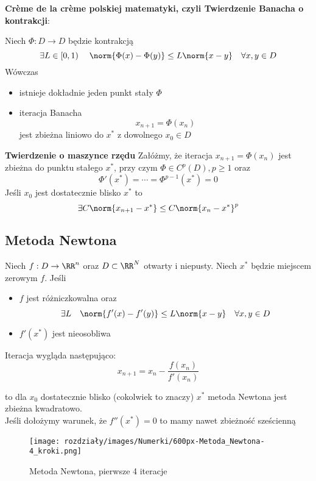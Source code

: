 \textbf{Crème de la crème polskiej matematyki, czyli Twierdzenie Banacha o kontrakcji}:

Niech $\Phi: D \to D$ będzie kontrakcją
$$
\exists L\in[0,1)  \quad \; \norm{\Phi(x) - \Phi(y)} \leq L \norm{x-y}     \quad \forall x,y \in D
$$
Wówczas 

\begin{itemize}
    \item istnieje dokładnie jeden punkt stały $\Phi$

    \item iteracja Banacha
        $$
        x_{n+1} = \Phi(x_n)
        $$
        jest zbieżna liniowo do $x^*$ z dowolnego $x_0 \in D$ 
\end{itemize}

\textbf{Twierdzenie o maszynce rzędu}
Załóżmy, że iteracja $x_{n+1} = \Phi(x_n)$ jest zbieżna do punktu stałego $x^*$, przy czym $\Phi \in C^p(D), p \geq 1$ oraz
$$
\Phi'(x^*) = \cdots = \Phi^{p-1}(x^*)= 0
$$
Jeśli $x_0$ jest dostatecznie blisko $x^*$ to
$$
\exists C \norm{x_{n+1} - x^*} \leq C \norm{x_n-x^*}^p
$$

\subsection{Metoda Newtona}
Niech $f: D \to \RR^n $ oraz $D \subset \RR^N$ otwarty i niepusty. Niech $x^*$ będzie miejscem zerowym $f$. Jeśli
\begin{itemize}
    \item $f$ jest różniczkowalna oraz
    $$
    \exists L \quad \norm{f'(x) - f'(y)} \leq L \norm{x-y}    \quad \forall x,y \in D
    $$
    \item $f'(x^*)$ jest nieosobliwa
\end{itemize}
Iteracja wygląda następująco:\\
$$
x_{n+1} = x_n - \frac{f(x_n)}{f'(x_n)}
$$

to dla $x_0$ dostatecznie blisko (cokolwiek to znaczy) $x^*$ metoda Newtona jest zbieżna kwadratowo.\\
Jeśli dołożymy warunek, że $f''(x^*)=0$ to mamy nawet zbieżność sześcienną

\begin{figure}[H]
    \centering
    \texttt{[image: rozdziały/images/Numerki/600px-Metoda\_Newtona-4\_kroki.png]}
    \caption{Metoda Newtona, pierwsze 4 iteracje}
    \label{fig:enter-label}
\end{figure}


